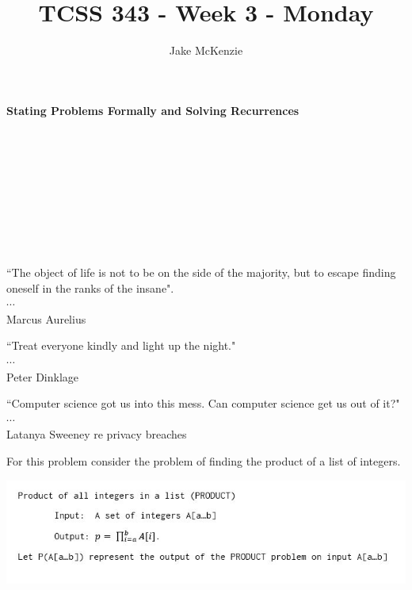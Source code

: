 \documentclass[12pt]{article}
\begin{document}
\title{TCSS 343 - Week 3 - Monday}
\author{Jake McKenzie}
\maketitle
\noindent\centerline{\textbf{Stating Problems Formally and Solving Recurrences}}\\\\\\\\\\\\\\\\
\begin{center}
    ``The object of life is not to be on the side of the majority, but to escape finding oneself in the ranks of the insane". \\$\cdots$\\ Marcus Aurelius
\end{center}
\begin{center}
    ``Treat everyone kindly and light up the night."\\
    $\cdots$\\
    Peter Dinklage
\end{center}
\begin{center}
    ``Computer science got us into this mess. Can computer science get us out of it?"\\
    $\cdots$\\
    Latanya Sweeney re privacy breaches
\end{center}
\newpage
\noindent For this problem consider the problem of finding the product of a list of integers.\\
\centerline{\includegraphics[scale = 0.8]{product.jpg}}
\end{document}
